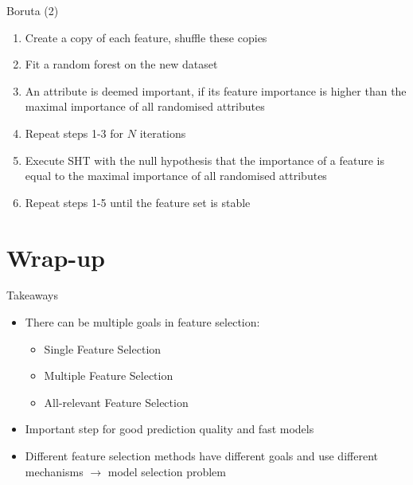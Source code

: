 \documentclass[11pt,compress,t,notes=noshow, xcolor=table]{beamer}
\begin{document}
\begin{frame}{Boruta (2)}
    \vfill
    \begin{enumerate}
        \item Create a copy of each feature, shuffle these copies
        \item Fit a random forest on the new dataset
        \item An attribute is deemed important, if its feature importance is higher than the maximal importance of all randomised attributes
        \item Repeat steps 1-3 for $N$ iterations
        \item Execute SHT with the null hypothesis that the importance of a feature is equal to the maximal importance of all randomised attributes
        \item Repeat steps 1-5 until the feature set is stable
    \end{enumerate}
    \vfill
\end{frame}

\section{Wrap-up}

\begin{frame}{Takeaways}
    \vfill
    \begin{itemize}
        \item There can be multiple goals in feature selection:
        \begin{itemize}
            \item Single Feature Selection
            \item Multiple Feature Selection
            \item All-relevant Feature Selection
        \end{itemize}
        \item Important step for good prediction quality and fast models
        \item Different feature selection methods have different goals and use different mechanisms $\rightarrow$ model selection problem
    \end{itemize}
    \vfill
\end{frame}

\endlecture
\end{document}
